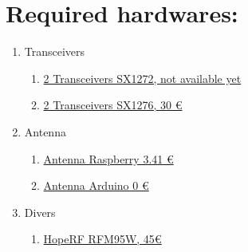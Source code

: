 \section{Required hardwares:}

	\begin{enumerate}
		\item Transceivers
		\begin{enumerate}
			\item \href{https://www.amazon.fr/waspmote-Lora-SMA-4-5-dBi-900/dp/B01D8Y0JPA}
			{2 Transceivers SX1272, not available yet}
			\item \href{http://modtronix.com/inair9.html}
			{2 Transceivers SX1276, 30 \euro}
			\end{enumerate}
						\item Antenna 
			\begin{enumerate}
				\item \href{https://fr.aliexpress.com/item/ALLISHOP868Mhz-5dbi-Gain-OMNI-Antenna-SMAMale-19cm-Rotatable-Omni-WirelessWifi-Antenna-SMAMale/32771698006.html?spm=a2g0s.90 42311.0.0.62876c37iHwvko}
				{Antenna Raspberry 3.41 \euro}
				\item \href{http://modtronix.com/ant-f105-868.html}
				{Antenna Arduino 0 \euro}
			\end{enumerate}
					\item Divers
			\begin{enumerate}
				\item \href{https://fr.farnell.com/hoperf/rfm95w-868s2/transceiver-868mhz-fsk-ook/dp/2759294}
				{HopeRF RFM95W, 45\euro}
			\end{enumerate}
					\end{enumerate}

